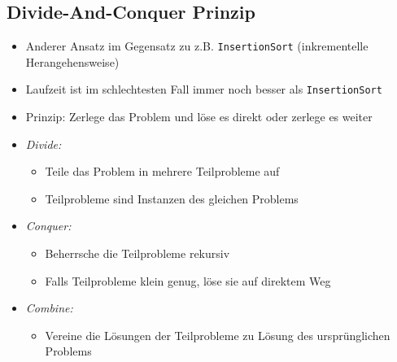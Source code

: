 \documentclass[
    12pt,
    a4paper,
    ngerman,
    color=3b,%
    marginpar=false,
    colorback=false,
    leqno,
]{tudaexercise}
\begin{document}
\subsection{Divide-And-Conquer Prinzip}\label{Divide-And-Conquer}
\begin{itemize}
    \item Anderer Ansatz im Gegensatz zu z.B. \texttt{InsertionSort} (inkrementelle Herangehensweise)
    \item Laufzeit ist im schlechtesten Fall immer noch besser als \texttt{InsertionSort}
    \item Prinzip: Zerlege das Problem und löse es direkt oder zerlege es weiter
    \item \textit{Divide:}
          \begin{itemize}
              \item Teile das Problem in mehrere Teilprobleme auf
              \item Teilprobleme sind Instanzen des gleichen Problems
          \end{itemize}
    \item \textit{Conquer:}
          \begin{itemize}
              \item Beherrsche die Teilprobleme rekursiv
              \item Falls Teilprobleme klein genug, löse sie auf direktem Weg
          \end{itemize}
    \item \textit{Combine:}
          \begin{itemize}
              \item Vereine die Lösungen der Teilprobleme zu Lösung des ursprünglichen Problems
          \end{itemize}
\end{itemize}
\clearpage
\end{document}
